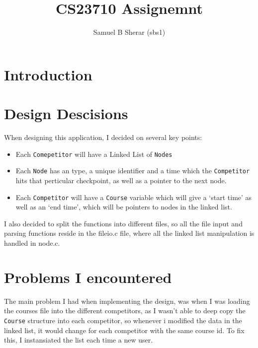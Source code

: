 \documentclass{article}
\begin{document}
\title{CS23710 Assignemnt}
\author{Samuel B Sherar (sbs1)}

\maketitle

\appendix
\section{Introduction}

\section{Design Descisions}
When designing this application, I decided on several key points:

\begin{itemize}
	\item Each \texttt{Comepetitor} will have a Linked List of \texttt{Nodes}
	\item Each \texttt{Node} has an type, a unique identifier and a time which the \texttt{Competitor} hits that perticular checkpoint, as well as a pointer to the next node. 
	\item Each \texttt{Competitor} will have a \texttt{Course} variable which will give a `start time' as well as an `end time', which will be pointers to nodes in the linked list.
	
\end{itemize}

I also decided to split the functions into different files, so all the file input and parsing functions reside in the fileio.c file, where all the linked list manipulation is handled in node.c.

\section{Problems I encountered}
The main problem I had when implementing the design, was when I was loading the courses file into the different competitors, as I wasn't able to deep copy the \texttt{Course} structure into each competitor, so whenever i modified the data in the linked list, it would change for each competitor with the same course id. To fix this, I instansiated the list each time a new user.
\end{document}
